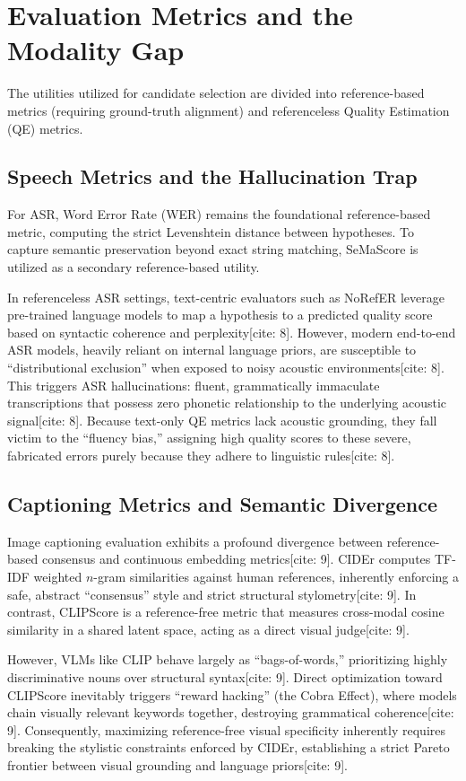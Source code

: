 \section{Evaluation Metrics and the Modality Gap}
\label{sec:metrics_and_modality_gap}

The utilities utilized for candidate selection are divided into reference-based metrics (requiring ground-truth alignment) and referenceless Quality Estimation (QE) metrics.

\subsection{Speech Metrics and the Hallucination Trap}
For ASR, Word Error Rate (WER) remains the foundational reference-based metric, computing the strict Levenshtein distance between hypotheses. To capture semantic preservation beyond exact string matching, SeMaScore is utilized as a secondary reference-based utility.

In referenceless ASR settings, text-centric evaluators such as NoRefER leverage pre-trained language models to map a hypothesis to a predicted quality score based on syntactic coherence and perplexity[cite: 8]. However, modern end-to-end ASR models, heavily reliant on internal language priors, are susceptible to ``distributional exclusion'' when exposed to noisy acoustic environments[cite: 8]. This triggers ASR hallucinations: fluent, grammatically immaculate transcriptions that possess zero phonetic relationship to the underlying acoustic signal[cite: 8]. Because text-only QE metrics lack acoustic grounding, they fall victim to the ``fluency bias,'' assigning high quality scores to these severe, fabricated errors purely because they adhere to linguistic rules[cite: 8].

\subsection{Captioning Metrics and Semantic Divergence}
Image captioning evaluation exhibits a profound divergence between reference-based consensus and continuous embedding metrics[cite: 9].
CIDEr computes TF-IDF weighted $n$-gram similarities against human references, inherently enforcing a safe, abstract ``consensus'' style and strict structural stylometry[cite: 9]. In contrast, CLIPScore is a reference-free metric that measures cross-modal cosine similarity in a shared latent space, acting as a direct visual judge[cite: 9]. 

However, VLMs like CLIP behave largely as ``bags-of-words,'' prioritizing highly discriminative nouns over structural syntax[cite: 9]. Direct optimization toward CLIPScore inevitably triggers ``reward hacking'' (the Cobra Effect), where models chain visually relevant keywords together, destroying grammatical coherence[cite: 9]. Consequently, maximizing reference-free visual specificity inherently requires breaking the stylistic constraints enforced by CIDEr, establishing a strict Pareto frontier between visual grounding and language priors[cite: 9].

